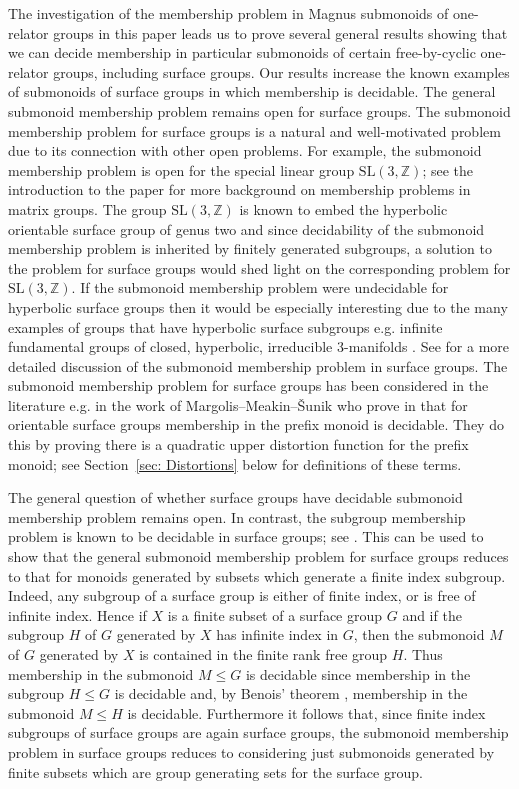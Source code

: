 \documentclass[11pt]{amsart}
\newcommand{\Z}{\mathbb{Z}}
\theoremstyle{plain}
\theoremstyle{definition}
\begin{document}
The investigation of the membership problem in Magnus submonoids of one-relator groups in this paper leads us to prove several general results showing that we can decide membership in particular submonoids of certain free-by-cyclic one-relator groups, including surface groups. Our results increase the known examples of submonoids of surface groups in which membership is decidable. The general submonoid membership problem 
remains open for surface groups. 
The submonoid membership problem for surface groups is a natural and well-motivated problem due to its connection with other open problems. For example, the submonoid membership problem is open for the special linear group $\mathrm{SL}(3,\Z)$; 
see the introduction to the paper \cite{semukhin2019reachability} for more background on membership problems in matrix groups. 
The group $\mathrm{SL}(3,\Z)$ is known to embed the hyperbolic orientable surface group of genus two \cite{long2011zariski} and since decidability of the submonoid membership problem is inherited by finitely generated subgroups, a solution to the problem for surface groups would shed light on the corresponding problem for $\mathrm{SL}(3,\Z)$. 
If the submonoid membership problem were undecidable for hyperbolic surface groups then it would be especially interesting due to the many examples of groups that have hyperbolic surface subgroups e.g.  infinite fundamental groups of  closed, hyperbolic, irreducible 3-manifolds \cite{KahnMarkovic}.
See \cite[Section~3.1]{Foniqi_Gray_Nyberg-Brodda_2025} for a more detailed discussion of the submonoid membership problem in surface groups.   
The submonoid membership problem for surface groups has been considered in the literature e.g. in the work of Margolis--Meakin--\v{S}unik who prove in \cite[Proposition 2.10]{margolis2005distortion} that for orientable surface groups membership in the prefix monoid is decidable. They do this by proving there is a quadratic upper distortion function for the prefix monoid; 
see Section~\ref{sec: Distortions} below for definitions of these terms. 

The general question of whether surface groups have decidable submonoid membership problem remains open. In contrast, the subgroup membership problem is known to be decidable in surface groups; see \cite{scott1978subgroups}. 
This can be used to show that the general submonoid membership problem for surface groups reduces to that for monoids generated by subsets which generate a finite index subgroup. Indeed, any subgroup of a surface group is either of finite index, or is free of infinite index. Hence if $X$ is a finite subset of a surface group $G$ and if the subgroup $H$ of $G$ generated by $X$ has infinite index in $G$, then the submonoid $M$ of $G$ generated by $X$ is contained in the finite rank free group $H$. 
Thus membership in the submonoid $M \leq G$ is decidable since membership in the subgroup $H \leq G$ is decidable and, by Benois' theorem \cite{Benois}, membership in the submonoid $M \leq H$ is decidable. 
Furthermore it follows that, since finite index subgroups of surface groups are again surface groups, the submonoid membership problem in surface groups reduces to considering just submonoids generated by finite subsets which are group generating sets for the surface group.
\end{document}
